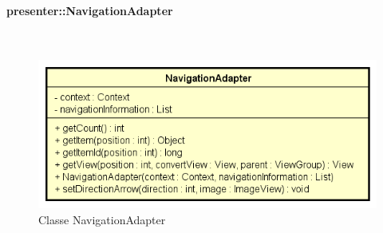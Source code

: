 \documentclass[../DefinizioneDiProdotto.tex]{subfiles}
\begin{document}
\paragraph{presenter::NavigationAdapter}
\
\begin{figure}[H]
	\centering
	\includegraphics[width=\maxwidth]{img/NavigationAdapter.png}
	\caption{Classe NavigationAdapter}\label{fig:presenter::NavigationAdapter} 
\end{figure}
\end{document}
